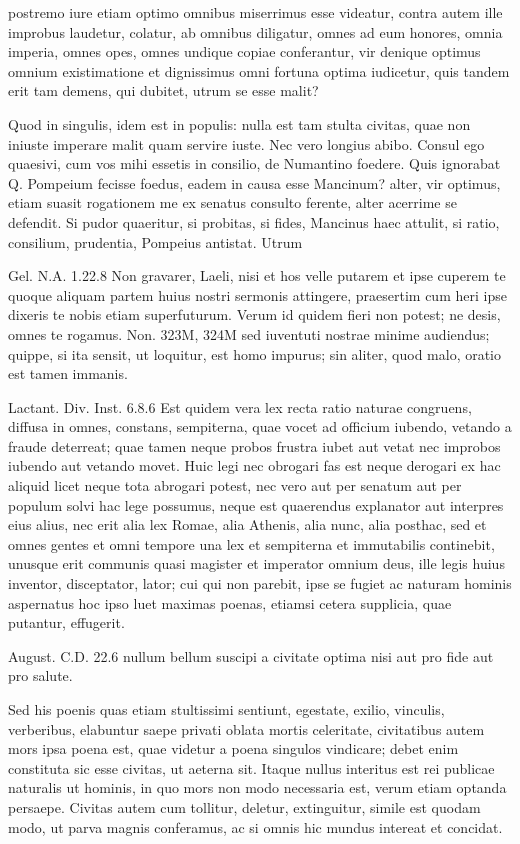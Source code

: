  postremo iure etiam optimo omnibus miserrimus esse videatur, contra autem ille improbus laudetur, colatur, ab omnibus diligatur, omnes ad eum honores, omnia imperia, omnes opes, omnes undique copiae conferantur, vir denique optimus omnium existimatione et dignissimus omni fortuna optima iudicetur, quis tandem erit tam demens, qui dubitet, utrum se esse malit?

 Quod in singulis, idem est in populis: nulla est tam stulta civitas, quae non iniuste imperare malit quam servire iuste. Nec vero longius abibo. Consul ego quaesivi, cum vos mihi essetis in consilio, de Numantino foedere. Quis ignorabat Q. Pompeium fecisse foedus, eadem in causa esse Mancinum? alter, vir optimus, etiam suasit rogationem me ex senatus consulto ferente, alter acerrime se defendit. Si pudor quaeritur, si probitas, si fides, Mancinus haec attulit, si ratio, consilium, prudentia, Pompeius antistat. Utrum

 Gel. N.A. 1.22.8 Non gravarer, Laeli, nisi et hos velle putarem et ipse cuperem te quoque aliquam partem huius nostri sermonis attingere, praesertim cum heri ipse dixeris te nobis etiam superfuturum. Verum id quidem fieri non potest; ne desis, omnes te rogamus. Non. 323M, 324M sed iuventuti nostrae minime audiendus; quippe, si ita sensit, ut loquitur, est homo impurus; sin aliter, quod malo, oratio est tamen immanis.

 Lactant. Div. Inst. 6.8.6 Est quidem vera lex recta ratio naturae congruens, diffusa in omnes, constans, sempiterna, quae vocet ad officium iubendo, vetando a fraude deterreat; quae tamen neque probos frustra iubet aut vetat nec improbos iubendo aut vetando movet. Huic legi nec obrogari fas est neque derogari ex hac aliquid licet neque tota abrogari potest, nec vero aut per senatum aut per populum solvi hac lege possumus, neque est quaerendus explanator aut interpres eius alius, nec erit alia lex Romae, alia Athenis, alia nunc, alia posthac, sed et omnes gentes et omni tempore una lex et sempiterna et immutabilis continebit, unusque erit communis quasi magister et imperator omnium deus, ille legis huius inventor, disceptator, lator; cui qui non parebit, ipse se fugiet ac naturam hominis aspernatus hoc ipso luet maximas poenas, etiamsi cetera supplicia, quae putantur, effugerit.

 August. C.D. 22.6 nullum bellum suscipi a civitate optima nisi aut pro fide aut pro salute.

 Sed his poenis quas etiam stultissimi sentiunt, egestate, exilio, vinculis, verberibus, elabuntur saepe privati oblata mortis celeritate, civitatibus autem mors ipsa poena est, quae videtur a poena singulos vindicare; debet enim constituta sic esse civitas, ut aeterna sit. Itaque nullus interitus est rei publicae naturalis ut hominis, in quo mors non modo necessaria est, verum etiam optanda persaepe. Civitas autem cum tollitur, deletur, extinguitur, simile est quodam modo, ut parva magnis conferamus, ac si omnis hic mundus intereat et concidat.

